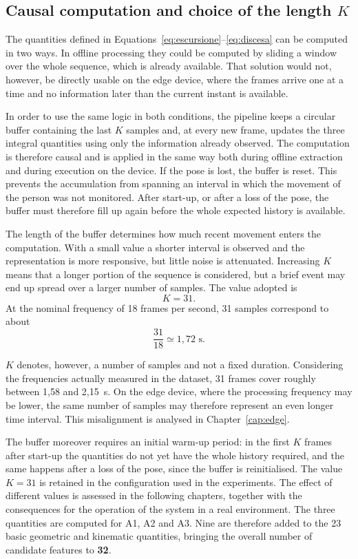 \subsection{Causal computation and choice of the length $K$}

The quantities defined in Equations~\eqref{eq:escursione}--\eqref{eq:discesa} can be computed in two ways. In offline processing they could be computed by sliding a window over the whole sequence, which is already available. That solution would not, however, be directly usable on the edge device, where the frames arrive one at a time and no information later than the current instant is available.

In order to use the same logic in both conditions, the pipeline keeps a circular buffer containing the last \(K\) samples and, at every new frame, updates the three integral quantities using only the information already observed. The computation is therefore causal and is applied in the same way both during offline extraction and during execution on the device.
If the pose is lost, the buffer is reset. This prevents the accumulation from spanning an interval in which the movement of the person was not monitored. After start-up, or after a loss of the pose, the buffer must therefore fill up again before the whole expected history is available.

The length of the buffer determines how much recent movement enters the computation. With a small value a shorter interval is observed and the representation is more responsive, but little noise is attenuated. Increasing \(K\) means that a longer portion of the sequence is considered, but a brief event may end up spread over a larger number of samples. The value adopted is
\[
K=31.
\]
At the nominal frequency of 18 frames per second, 31 samples correspond to about
\[
\frac{31}{18}\simeq 1{,}72\text{ s}.
\]

\(K\) denotes, however, a number of samples and not a fixed duration. Considering the frequencies actually measured in the dataset, 31 frames cover roughly between 1,58 and 2,15~s. On the edge device, where the processing frequency may be lower, the same number of samples may therefore represent an even longer time interval. This misalignment is analysed in Chapter~\ref{cap:edge}.

The buffer moreover requires an initial warm-up period: in the first \(K\) frames after start-up the quantities do not yet have the whole history required, and the same happens after a loss of the pose, since the buffer is reinitialised. The value \(K=31\) is retained in the configuration used in the experiments. The effect of different values is assessed in the following chapters, together with the consequences for the operation of the system in a real environment.
The three quantities are computed for A1, A2 and A3. Nine are therefore added to the 23 basic geometric and kinematic quantities, bringing the overall number of candidate features to \textbf{32}.

